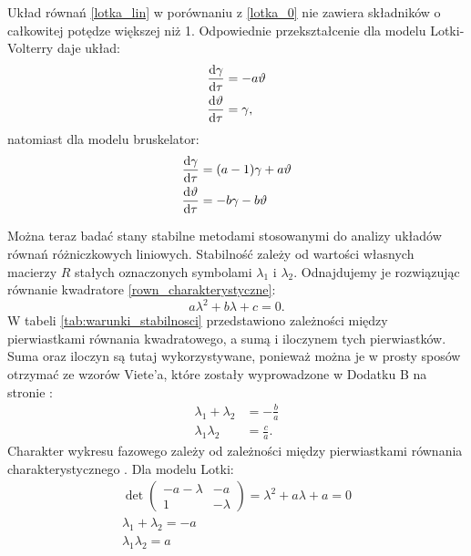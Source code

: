 \documentclass[10pt, a4paper, twoside, onecolumn]{article}
\numberwithin{equation}{section}
\begin{document}
	Układ równań \eqref{lotka_lin} w porównaniu z \eqref{lotka_0} nie zawiera składników o całkowitej potędze większej niż 1. Odpowiednie przekształcenie dla modelu Lotki-Volterry daje układ:
	\begin{equation}\label{lotka_volterra_lin}
	\begin{split}
		\dv{\gamma}{\tau} &= -a\vartheta \\
		\dv{\vartheta}{\tau} &= \gamma,
	\end{split}
	\end{equation}
	natomiast dla modelu bruskelator:
	\begin{equation}\label{bruskelator_lin}
	\begin{split}
		\dv{\gamma}{\tau} &= (a-1)\gamma+a\vartheta \\
		\dv{\vartheta}{\tau} &= -b\gamma-b\vartheta
	\end{split}
	\end{equation}\par
	Można teraz badać stany stabilne metodami stosowanymi do analizy układów równań różniczkowych liniowych. Stabilność zależy od wartości własnych macierzy $R$ stałych oznaczonych symbolami \(\lambda_{1}\) i \(\lambda_{2}\). Odnajdujemy je rozwiązując równanie kwadratore \eqref{rown_charakterystyczne}:
	\begin{equation}\label{rown_charakterystyczne}
		a\lambda^{2} + b\lambda + c = 0.
	\end{equation}
	W tabeli \ref{tab:warunki_stabilnosci} przedstawiono zależności między pierwiastkami równania kwadratowego, a sumą i iloczynem tych pierwiastków. Suma oraz iloczyn są tutaj wykorzystywane, ponieważ można je w prosty sposów otrzymać ze wzorów Viete'a, które zostały wyprowadzone w Dodatku B na stronie \pageref{sec: dodatek B}: 
	\begin{equation}
	\begin{split}
		\lambda_{1} + \lambda_{2} &= -\frac{b}{a} \\
		\lambda_{1}\lambda_{2} &= \frac{c}{a}.
	\end{split}
	\end{equation}
	Charakter wykresu fazowego zależy od zależności między pierwiastkami równania charakterystycznego \cite{orlik}.
	Dla modelu Lotki:
	\begin{equation}\label{lotka_charakterystyczne}
	\begin{split}
		\det
		\begin{pmatrix}
			-a-\lambda & -a \\
			1 & -\lambda
		\end{pmatrix}
		=\lambda^{2}+a\lambda+a=0 \\
		\lambda_{1}+\lambda_{2}=-a \\
		\lambda_{1}\lambda_{2}=a
	\end{split}
	\end{equation}
\end{document}
